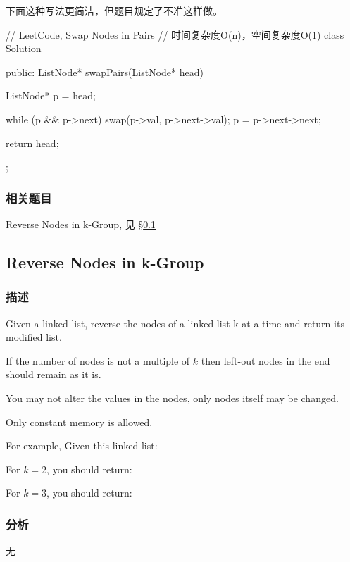 下面这种写法更简洁，但题目规定了不准这样做。
\begin{Code}
// LeetCode, Swap Nodes in Pairs
// 时间复杂度O(n)，空间复杂度O(1)
class Solution {
public:
    ListNode* swapPairs(ListNode* head) {
        ListNode* p = head;

        while (p && p->next) {
            swap(p->val, p->next->val);
            p = p->next->next;
        }

        return head;
    }
};
\end{Code}

\subsubsection{相关题目}

\begindot
\item Reverse Nodes in k-Group, 见 \S \ref{sec:reverse-nodes-in-k-group}
\myenddot


\subsection{Reverse Nodes in k-Group}
\label{sec:reverse-nodes-in-k-group}


\subsubsection{描述}
Given a linked list, reverse the nodes of a linked list k at a time and return its modified list.

If the number of nodes is not a multiple of $k$ then left-out nodes in the end should remain as it is.

You may not alter the values in the nodes, only nodes itself may be changed.

Only constant memory is allowed.

For example,
Given this linked list: 

For $k = 2$, you should return: 

For $k = 3$, you should return: 


\subsubsection{分析}
无


